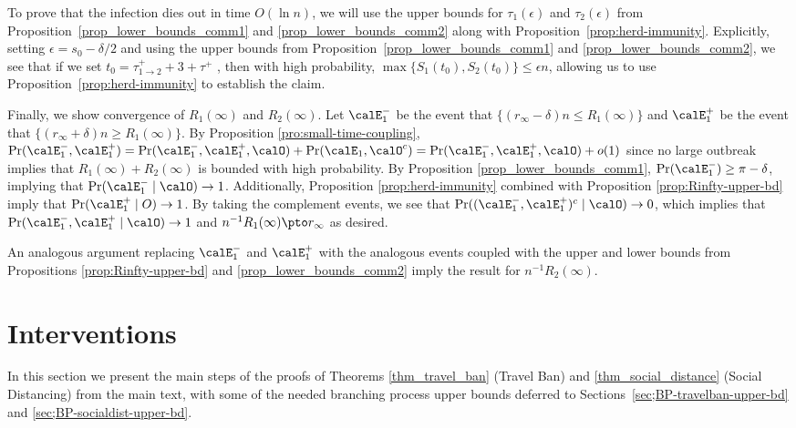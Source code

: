 \documentclass[11pt]{article}
\begin{document}
\begin{enumerate}[label=(\alph*)]
To prove that the infection dies out in time $O(\ln n)$, we will use the upper bounds for $\tau_1(\epsilon)$ and $\tau_2(\epsilon)$ from Proposition~\ref{prop_lower_bounds_comm1} and \ref{prop_lower_bounds_comm2} along with Proposition~\ref{prop:herd-immunity}. Explicitly, setting $\epsilon=s_0-\delta/2$ and using the upper bounds from Proposition~\ref{prop_lower_bounds_comm1} and \ref{prop_lower_bounds_comm2}, we see that if we set $t_0=\tau_{1\to 2}^++3+\tau^+$ , then with high probability, $\max\{S_1(t_0),S_2(t_0)\}\leq \epsilon n$, allowing us to use   Proposition~\ref{prop:herd-immunity} to establish the claim.
    
    Finally, we show convergence of $R_1(\infty)$ and $R_2(\infty)$. Let $\calE_1^-$ be the event that $\{(r_\infty - \delta) n \leq R_1(\infty)\}$ and $\calE_1^+$ be the event that $\{(r_\infty + \delta) n \geq R_1(\infty)\}$. By Proposition \ref{pro:small-time-coupling}, $\Pr(\calE_1^-, \calE_1^+) = \Pr(\calE_1^-, \calE_1^+, \calO) + \Pr(\calE_1, \calO^c) = \Pr(\calE_1^-, \calE_1^+,\calO) + o(1)$ since no large outbreak implies that $R_1(\infty) + R_2(\infty)$ is bounded with high probability. By Proposition \ref{prop_lower_bounds_comm1}, $\Pr(\calE_1^-) \geq \pi-\delta$, implying that $\Pr(\calE_1^- \mid \calO) \to 1$. Additionally, Proposition \ref{prop:herd-immunity} combined with Proposition \ref{prop:Rinfty-upper-bd} imply that $\Pr(\calE_1^+ \mid O) \to 1$. By taking the complement events, we see that $\Pr((\calE_1^-, \calE_1^+)^c \mid \calO) \to 0$, which implies that $\Pr(\calE_1^-, \calE_1^+ \mid \calO) \to 1$ and $n^{-1}R_1(\infty) \pto r_\infty$ as desired. 
    
    An analogous argument replacing $\calE_1^-$ and $\calE_1^+$ with the analogous events coupled with the upper and lower bounds from Propositions \ref{prop:Rinfty-upper-bd} and \ref{prop_lower_bounds_comm2} imply the result for $n^{-1}R_2(\infty)$.
\end{enumerate}



\section{Interventions}
In this section we present the main steps of the proofs of Theorems \ref{thm_travel_ban} (Travel Ban) and \ref{thm_social_distance} (Social Distancing) from the main text, with some of the needed branching process upper bounds deferred to Sections~\ref{sec;BP-travelban-upper-bd} and \ref{sec;BP-socialdist-upper-bd}.
\end{document}
